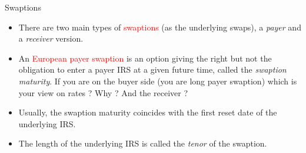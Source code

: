 \documentclass{beamer}
\begin{document}
\begin{frame}{Swaptions}
	\begin{itemize}
		\item There are two main types of \textcolor{red}{swaptions} (as the underlying swaps), a \emph{payer} and a \emph{receiver} version.
		\item An \textcolor{red}{European payer swaption} is an option giving the right but not the obligation to enter a payer IRS at a given future time, called the \emph{swaption maturity}. If you are on the buyer side (you are long payer swaption) which is your view on rates ? Why ? And the receiver ?
		\item Usually, the swaption maturity coincides with the first reset date of the underlying IRS.
		\item The length of the underlying IRS is called the \emph{tenor} of the swaption.
	\end{itemize}
\end{frame}
\end{document}
